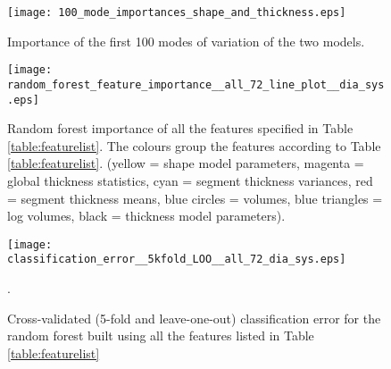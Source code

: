 \documentclass{llncs}
\begin{document}
		\begin{figure}[]
		\begin{center}
		
		\texttt{[image: 100\_mode\_importances\_shape\_and\_thickness.eps]}
	\caption{Importance of the first 100 modes of variation of the two models.}	
\label{fig:random_forest_feature_importance__100_shape_eigenvalues__and_100_thickness_modes_dia_sys}			\end{center}
		\end{figure}
	

		
		
		\begin{figure}[]
		\begin{center}
		
		\texttt{[image: random\_forest\_feature\_importance\_\_all\_72\_line\_plot\_\_dia\_sys.eps]}
		
\caption{Random forest importance of all the features specified in Table \ref{table:featurelist}. The colours group the features according to Table \ref{table:featurelist}. (yellow = shape model parameters, magenta = global thickness statistics, cyan = segment thickness variances, red = segment thickness means, blue circles = volumes, blue triangles = log volumes, black = thickness model parameters).}
\label{fig:random_forest_feature_importance__all_72__dia_sys}		\end{center}
	\end{figure}
	
	\begin{figure}[]
	\begin{center}
	

		\texttt{[image: classification\_error\_\_5kfold\_LOO\_\_all\_72\_dia\_sys.eps]}
\caption{Cross-validated (5-fold and leave-one-out) classification error for the random forest built using all the features listed in Table \ref{table:featurelist}}.	
\label{fig:classification_error__5kfold_LOO__all_72_dia_sys}			\end{center}
		\end{figure}
		
\end{document}
